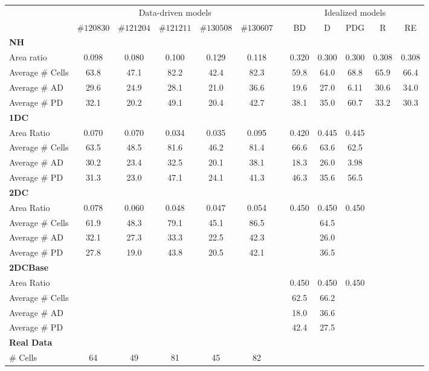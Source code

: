 \documentclass[11pt,a4paper, draft]{article}
\begin{document}
%
\begin{table}\centering
\begin{tabular}{@{}lccccccccccc@{}}\toprule
& \multicolumn{5}{c}{Data-driven models} & \phantom{abc}& \multicolumn{5}{c}{Idealized models}\\
\cmidrule{2-6} \cmidrule{8-12}
& $\#120830$ & $\#121204$ & $\#121211$ & $\#130508$ & $\#130607$ && BD & D & PDG & R & RE\\ \midrule
\textbf{NH}\\
Area ratio & 0.098 & 0.080 & 0.100 & 0.129 & 0.118 &&
0.320 & 0.300 & 0.300 & 0.308 & 0.308\\
Average $\#$ Cells & 63.8 & 47.1 & 82.2 & 42.4 & 82.3 &&
59.8 & 64.0 & 68.8 & 65.9 & 66.4\\
Average $\#$ AD & 29.6 & 24.9 & 28.1 & 21.0 & 36.6 &&
19.6 & 27.0 & 6.11 & 30.6 & 34.0\\
Average $\#$ PD & 32.1 & 20.2 & 49.1 & 20.4 & 42.7 &&
38.1 & 35.0 & 60.7 & 33.2 & 30.3\\
\textbf{1DC}\\
Area Ratio & 0.070 & 0.070 & 0.034 & 0.035 & 0.095 &&
0.420 & 0.445 & 0.445 & &\\
Average $\#$ Cells & 63.5 & 48.5 & 81.6 & 46.2 & 81.4 &&
66.6 & 63.6 & 62.5 & &\\
Average $\#$ AD & 30.2 & 23.4 & 32.5 & 20.1 & 38.1 &&
18.3 & 26.0 & 3.98 & &\\
Average $\#$ PD & 31.3 & 23.0 & 47.1 & 24.1 & 41.3 &&
46.3 & 35.6 & 56.5 & &\\
\textbf{2DC}\\
Area Ratio & 0.078 & 0.060 & 0.048 & 0.047 & 0.054 &&
0.450 & 0.450 & 0.450 & &\\
Average $\#$ Cells & 61.9 & 48.3 & 79.1 & 45.1 & 86.5 &&
& 64.5 & & &\\
Average $\#$ AD & 32.1 & 27.3 & 33.3 & 22.5 & 42.3 &&
& 26.0 & & &\\
Average $\#$ PD & 27.8 & 19.0 & 43.8 & 20.5 & 42.1 &&
& 36.5 & & &\\
\textbf{2DCBase}\\
Area Ratio & & & & & &&
0.450 & 0.450 & 0.450 & &\\
Average $\#$ Cells & & & & & &&
62.5 & 66.2 & & &\\
Average $\#$ AD & & & & & &&
18.0 & 36.6 & & &\\
Average $\#$ PD & & & & & &&
42.4 & 27.5 & & &\\
\textbf{Real Data}\\
$\#$ Cells & 64 & 49 & 81 & 45 & 82 &&

\end{tabular}
\end{table}
\end{document}
